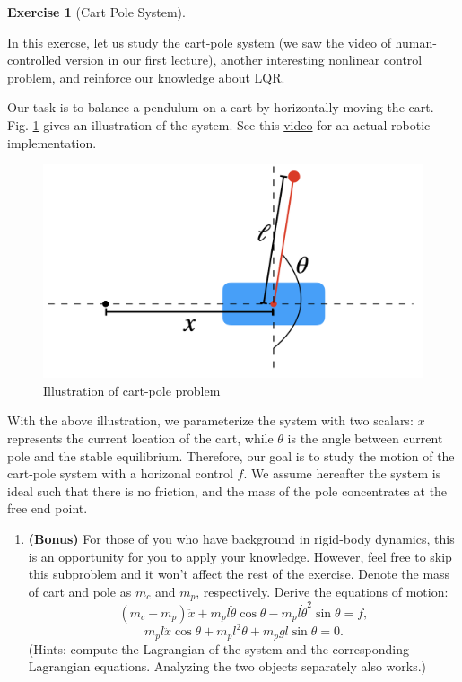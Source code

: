 \documentclass[
]{book}
\providecommand{\tightlist}{%
  \setlength{\itemsep}{0pt}\setlength{\parskip}{0pt}}
\theoremstyle{definition}
\theoremstyle{definition}
\theoremstyle{definition}
\newtheorem{exercise}{Exercise}[chapter]
\theoremstyle{definition}
\theoremstyle{remark}
\begin{document}
\begin{exercise}[Cart Pole System]
\protect\hypertarget{exr:cartpole}{}\label{exr:cartpole}

In this exercse, let us study the cart-pole system (we saw the video of human-controlled version in our first lecture), another interesting nonlinear control problem, and reinforce our knowledge about LQR.

Our task is to balance a pendulum on a cart by horizontally moving the cart. Fig. \ref{fig:cart-pole} gives an illustration of the system. See this \href{https://www.youtube.com/watch?v=Bzq96V1yN5k}{video} for an actual robotic implementation.

\begin{figure}

{\centering \includegraphics[width=0.6\linewidth]{images/cartpole} 

}

\caption{Illustration of cart-pole problem}\label{fig:cart-pole}
\end{figure}

With the above illustration, we parameterize the system with two scalars: \(x\) represents the current location of the cart, while \(\theta\) is the angle between current pole and the stable equilibrium. Therefore, our goal is to study the motion of the cart-pole system with a horizonal control \(f\). We assume hereafter the system is ideal such that there is no friction, and the mass of the pole concentrates at the free end point.

\begin{enumerate}
\def\labelenumi{\alph{enumi}.}
\tightlist
\item
  \textbf{(Bonus)} For those of you who have background in rigid-body dynamics, this is an opportunity for you to apply your knowledge. However, feel free to skip this subproblem and it won't affect the rest of the exercise.
  Denote the mass of cart and pole as \(m_c\) and \(m_p\), respectively. Derive the equations of motion:
  \begin{equation}
  \left(m_c+m_p\right) \ddot{x}+m_p l \ddot{\theta} \cos \theta-m_p l \dot{\theta}^2 \sin \theta=f,
  \label{eq:ex-cartpole-1}
  \end{equation}
  \begin{equation}
  m_p l \ddot{x} \cos \theta+m_p l^2 \ddot{\theta}+m_p g l \sin \theta=0.
  \label{eq:ex-cartpole-2}
  \end{equation}
  (Hints: compute the Lagrangian of the system and the corresponding Lagrangian equations. Analyzing the two objects separately also works.)
\end{enumerate}


\end{exercise}
\end{document}
